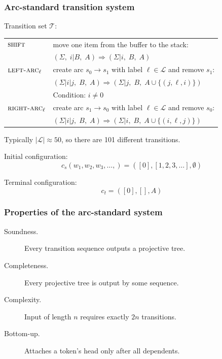 \documentclass[t]{beamer}
\begin{document}
\begin{frame}
  \frametitle{Arc-standard transition system \cite{nivre2004incrementality}}
  Transition set $\mathcal{T}$:

  \begin{tabular}{ll}
    $\textsc{shift}$ & move one item from the buffer to the stack: \\
    & $(\Sigma, \; i | B, \; A) \Rightarrow (\Sigma | i, \; B, \; A)$ \\
    \hline
    $\textsc{left-arc}_\ell$ & create arc $s_0 \to s_1$ with label $\ell \in \mathcal{L}$ and remove $s_1$: \\
    & $(\Sigma | i|j, \; B, \; A) \Rightarrow (\Sigma | j, \; B, \; A \cup \{(j,\ell,i)\})$ \\
    & Condition: $i\neq0$ \\
    \hline
    $\textsc{right-arc}_\ell$ & create arc $s_1 \to s_0$ with label $\ell \in \mathcal{L}$ and remove $s_0$: \\
    & $(\Sigma | i|j, \; B, \; A) \Rightarrow (\Sigma | i, \; B, \; A \cup \{(i,\ell,j)\})$  
  \end{tabular}
  
  \pause\vfill
  
  Typically $|\mathcal{L}| \approx 50$,
  so there are 101 different transitions.

  \pause\vfill

  Initial configuration:
  \[
    c_s(w_1, w_2, w_3, \ldots,) = ([0], [1, 2, 3, \ldots], \emptyset)
  \]

  Terminal configuration:
  \[
    c_t = ([0], [], A)
  \]
\end{frame}

\begin{frame}
  \frametitle{Properties of the arc-standard system
  }
  \begin{description}
  \item[Soundness.] Every transition sequence outputs a projective tree.
  \item[Completeness.] Every projective tree is output by some sequence.
  \item[Complexity.] Input of length $n$ requires exactly $2n$ transitions.
  \item[Bottom-up.] Attaches a token's head only after all dependents.
  \end{description}
\end{frame}
\end{document}
